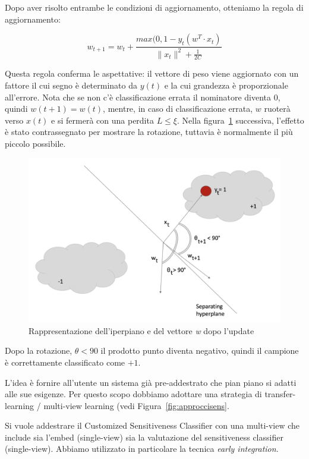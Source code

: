 Dopo aver risolto entrambe le condizioni di aggiornamento, otteniamo la regola di aggiornamento:

$$w_{t+1}=w_t+\frac{max(0,1-y_t(w^T\cdot x_t)}{\|x_t\|^2+\frac{1}{2C}}$$ 

Questa regola conferma le aspettative: il vettore di peso viene aggiornato con un fattore il cui segno è determinato da $y(t)$ e la cui grandezza è proporzionale all'errore. Nota che se non c'è classificazione errata il nominatore diventa $0$, quindi $w(t + 1) = w(t)$, mentre, in caso di classificazione errata, $w$ ruoterà verso $x(t)$ e si fermerà con una perdita $L \leq \xi$. Nella figura~\ref{fig:PAII2} successiva, l'effetto è stato contrassegnato per mostrare la rotazione, tuttavia è normalmente il più piccolo possibile.

\begin{figure}[h]
    \centering
    \includegraphics[scale=0.5]{Figure/PAII2.png}
    \caption{Rappresentazione dell'iperpiano e del vettore \textit{w} dopo l'update}
    \label{fig:PAII2}
\end{figure}
\FloatBarrier  


Dopo la rotazione, $\theta <90$ il prodotto punto diventa negativo, quindi il campione è correttamente classificato come $+1$.

L'idea è fornire all'utente un sistema già pre-addestrato che pian piano si adatti alle sue esigenze. Per questo scopo dobbiamo adottare una strategia di transfer-learning / multi-view learning\cite{transfer-learning} (vedi Figura~\ref{fig:approccisens}.

Si vuole addestrare il Customized Sensitiveness Classifier con una multi-view che include sia l'embed (single-view) sia la valutazione del sensitiveness classifier (single-view). Abbiamo utilizzato in particolare la tecnica \textit{early integration}. 

